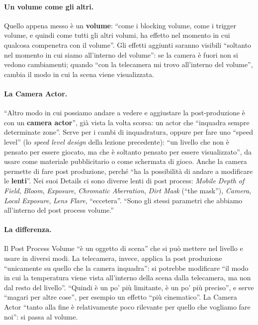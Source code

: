 \paragraph{Un volume come gli altri.} Quello appena messo è un \textbf{volume}: ``come i
blocking volume, come i trigger volume, e quindi come tutti gli altri volumi, ha effetto nel
momento in cui qualcosa compenetra con il volume''. Gli effetti aggiunti saranno visibili
``soltanto nel momento in cui siamo all'interno del volume'': se la camera è fuori non si
vedono cambiamenti; quando ``con la telecamera mi trovo all'interno del volume'', cambia il
modo in cui la scena viene visualizzata.

\paragraph{La Camera Actor.} ``Altro modo in cui possiamo andare a vedere e aggiustare la
post-produzione è con un \textbf{camera actor}'', già vista la volta scorsa: un actor che
``inquadra sempre determinate zone''. Serve per i cambi di inquadratura, oppure per fare uno
``speed level'' (lo \emph{speed level design} della lezione precedente): ``un livello che non è
pensato per essere giocato, ma che è soltanto pensato per essere visualizzato'', da usare come
materiale pubblicitario o come schermata di gioco. Anche la camera permette di fare post
produzione, perché ``ha la possibilità di andare a modificare le \textbf{lenti}''. Nei suoi
Details ci sono diverse lenti di post process: \emph{Mobile Depth of Field}, \emph{Bloom},
\emph{Exposure}, \emph{Chromatic Aberration}, \emph{Dirt Mask} (``the mask''),
\emph{Camera}, \emph{Local Exposure}, \emph{Lens Flare}, ``eccetera''. ``Sono gli stessi
parametri che abbiamo all'interno del post process volume.''

\paragraph{La differenza.} Il Post Process Volume ``è un oggetto di scena'' che si può
mettere nel livello e usare in diversi modi. La telecamera, invece, applica la post
produzione ``unicamente su quello che la camera inquadra'': si potrebbe modificare ``il modo
in cui la temperatura viene vista all'interno della scena dalla telecamera, ma non dal resto
del livello''. ``Quindi è un po' più limitante, è un po' più preciso'', e serve ``magari per
altre cose'', per esempio un effetto ``più cinematico''. La Camera Actor ``tanto alla fine è
relativamente poco rilevante per quello che vogliamo fare noi'': si passa al volume.

